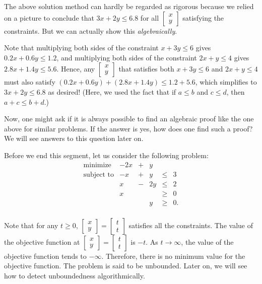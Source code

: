 The above solution method can hardly be regarded as rigorous because we
relied on a picture to conclude that \(3x + 2y \leq 6.8\) for all
\(\begin{bmatrix} x\\y\end{bmatrix}\) satisfying the constraints. But we
can actually show this \emph{algebraically}.

Note that multiplying both sides of the constraint \(x + 3y \leq 6\)
gives \(0.2x + 0.6 y \leq 1.2\), and multiplying both sides of the
constraint \(2x + y \leq 4\) gives \(2.8x + 1.4 y \leq 5.6\). Hence, any
\(\begin{bmatrix} x\\y\end{bmatrix}\) that satisfies both \(x+3y\leq 6\)
and \(2x+y \leq 4\) must also satisfy
\((0.2x+0.6y) + (2.8x+1.4y) \leq 1.2 + 5.6\), which simplifies to
\(3x + 2y \leq 6.8\) as desired! (Here, we used the fact that if
\(a \leq b\) and \(c \leq d\), then \(a+c \leq b+d\).)

Now, one might ask if it is always possible to find an algebraic proof
like the one above for similar problems. If the answer is yes, how does
one find such a proof? We will see answers to this question later on.

Before we end this segment, let us consider the following problem:
\[\begin{array}{rrcrll}
\mbox{minimize } & -2x & + & y & \\
\mbox{subject to} & -x & + & y & \leq & 3 \\
& x & - &  2y & \leq & 2 \\
& x &  & & \geq & 0 \\
& & & y & \geq & 0. \\
\end{array}\]

Note that for any \(t \geq 0\),
\(\begin{bmatrix} x \\ y\end{bmatrix} = \begin{bmatrix} t \\ t\end{bmatrix}\)
satisfies all the constraints. The value of the objective function at
\(\begin{bmatrix} x \\ y\end{bmatrix} = \begin{bmatrix} t \\ t\end{bmatrix}\)
is \(-t\). As \(t \rightarrow \infty\), the value of the objective
function tends to \(-\infty\). Therefore, there is no minimum value for
the objective function. The problem is said to be unbounded. Later on,
we will see how to detect unboundedness algorithmically.

